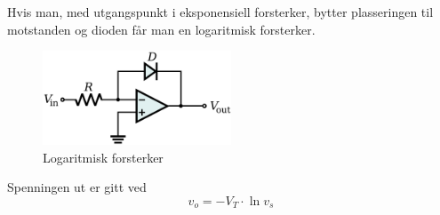 Hvis man, med utgangspunkt i eksponensiell forsterker, bytter plasseringen
til motstanden og dioden får man en logaritmisk forsterker.

\begin{figure}[H]
  \caption{Logaritmisk forsterker}
  \centering
  \includegraphics[width=0.5\textwidth]{./img/logamp}
\end{figure}

Spenningen ut er gitt ved
$$v_o = -V_T \cdot \ln{v_s}$$
